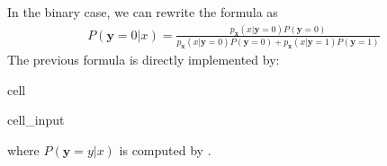 \documentclass[letterpaper,10pt,english]{jupyterBook}
\begin{document}
\sphinxAtStartPar
In the binary case, we can rewrite the formula as
\begin{equation*}
\begin{split}P(\mathbf{y}=0|x) = \frac{p_\mathbf{x}(x|\mathbf{y}=0)P(\mathbf{y}=0)}{p_{\mathbf{x}}(x|\mathbf{y}=0)P(\mathbf{y}=0)+p_{\mathbf{x}}(x|\mathbf{y}=1
)P(\mathbf{y}=1)}\end{split}
\end{equation*}
\sphinxAtStartPar
The previous formula is directly implemented by:

\begin{sphinxuseclass}{cell}\begin{sphinxVerbatimInput}

\begin{sphinxuseclass}{cell_input}
\begin{sphinxVerbatim}[commandchars=\\\{\}]
     
           
\end{sphinxVerbatim}

\end{sphinxuseclass}\end{sphinxVerbatimInput}

\end{sphinxuseclass}
\sphinxAtStartPar
where \(P(\mathbf{y}=y|x)\) is computed by .
\end{document}
